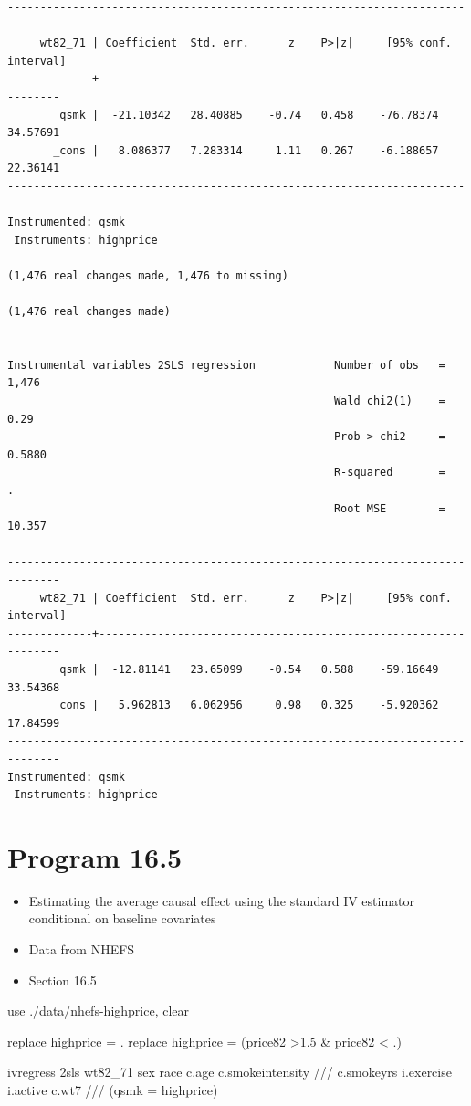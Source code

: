 \documentclass[
  10pt,
  a4paper,
]{book}
\newenvironment{Shaded}{\begin{snugshade}}{\end{snugshade}}
\newcommand{\CommentTok}[1]{\textcolor[rgb]{0.37,0.37,0.37}{#1}}
\newcommand{\KeywordTok}[1]{\textcolor[rgb]{0.00,0.46,0.62}{#1}}
\newcommand{\NormalTok}[1]{\textcolor[rgb]{0.00,0.46,0.62}{#1}}
\providecommand{\tightlist}{%
  \setlength{\itemsep}{0pt}\setlength{\parskip}{0pt}}
\begin{document}
\begin{verbatim}
------------------------------------------------------------------------------
     wt82_71 | Coefficient  Std. err.      z    P>|z|     [95% conf. interval]
-------------+----------------------------------------------------------------
        qsmk |  -21.10342   28.40885    -0.74   0.458    -76.78374    34.57691
       _cons |   8.086377   7.283314     1.11   0.267    -6.188657    22.36141
------------------------------------------------------------------------------
Instrumented: qsmk
 Instruments: highprice

(1,476 real changes made, 1,476 to missing)

(1,476 real changes made)


Instrumental variables 2SLS regression            Number of obs   =      1,476
                                                  Wald chi2(1)    =       0.29
                                                  Prob > chi2     =     0.5880
                                                  R-squared       =          .
                                                  Root MSE        =     10.357

------------------------------------------------------------------------------
     wt82_71 | Coefficient  Std. err.      z    P>|z|     [95% conf. interval]
-------------+----------------------------------------------------------------
        qsmk |  -12.81141   23.65099    -0.54   0.588    -59.16649    33.54368
       _cons |   5.962813   6.062956     0.98   0.325    -5.920362    17.84599
------------------------------------------------------------------------------
Instrumented: qsmk
 Instruments: highprice
\end{verbatim}

\hypertarget{program-16.5-1}{%
\section{Program 16.5}\label{program-16.5-1}}

\begin{itemize}
\tightlist
\item
  Estimating the average causal effect using the standard IV estimator conditional on baseline covariates
\item
  Data from NHEFS
\item
  Section 16.5
\end{itemize}

\begin{Shaded}
\begin{Highlighting}[]
\KeywordTok{use}\NormalTok{ ./}\KeywordTok{data}\NormalTok{/nhefs{-}highprice, }\KeywordTok{clear}

\KeywordTok{replace}\NormalTok{ highprice = .}
\KeywordTok{replace}\NormalTok{ highprice = (price82 \textgreater{}1.5 \& price82 \textless{} .)}

\NormalTok{ivregress 2sls wt82\_71 sex race c.age c.smokeintensity }\CommentTok{///}
\NormalTok{  c.smokeyrs i.exercise i.active c.wt7 }\CommentTok{///}
\NormalTok{  (qsmk = highprice)}
\end{Highlighting}
\end{Shaded}
\end{document}
